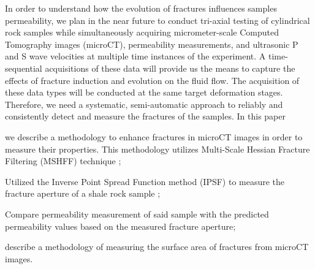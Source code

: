 \documentclass{edger}
\begin{document}
In order to understand how the evolution of fractures influences samples permeability, we plan in the near future to conduct tri-axial testing of cylindrical rock samples while simultaneously acquiring micrometer-scale Computed Tomography images (microCT), permeability measurements, and ultrasonic P and S wave velocities at multiple time instances of the experiment. A time-sequential acquisitions of these data will provide us the means to capture the effects of fracture induction and evolution on the fluid flow. The acquisition of these data types will be conducted at the same target deformation stages. Therefore, we need a systematic, semi-automatic approach to reliably and consistently detect and measure the fractures of the samples. In this paper \begin{enumerate*}[label=\arabic*)] 
\item we describe a methodology to enhance fractures in microCT images in order to measure their properties. This methodology utilizes Multi-Scale Hessian Fracture Filtering (MSHFF) technique \citep{Voorn2013}; 
\item {} Utilized the Inverse Point Spread Function method (IPSF) to measure the fracture aperture of a shale rock sample \citep{Ketcham2010}; 
\item Compare permeability measurement of said sample with the predicted permeability values based on the measured fracture aperture; 
\item describe a methodology of measuring the surface area of fractures from microCT images.\end{enumerate*}

\end{document}
